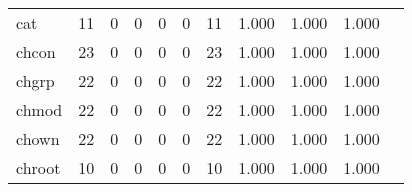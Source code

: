 \begin{longtable}{lp{1.20cm}p{1.20cm}p{1.20cm}p{1.20cm}p{1.20cm}p{1.20cm}p{1.20cm}p{1.20cm}p{1.20cm}p{1.20cm}}
cat       &                                    11 &                                                  0 &                                                  0 &                                                  0 &                                                  0 &                                                 11 &                                         1.000 &                                              1.000 &                                              1.000 \\
chcon     &                                    23 &                                                  0 &                                                  0 &                                                  0 &                                                  0 &                                                 23 &                                         1.000 &                                              1.000 &                                              1.000 \\
chgrp     &                                    22 &                                                  0 &                                                  0 &                                                  0 &                                                  0 &                                                 22 &                                         1.000 &                                              1.000 &                                              1.000 \\
chmod     &                                    22 &                                                  0 &                                                  0 &                                                  0 &                                                  0 &                                                 22 &                                         1.000 &                                              1.000 &                                              1.000 \\
chown     &                                    22 &                                                  0 &                                                  0 &                                                  0 &                                                  0 &                                                 22 &                                         1.000 &                                              1.000 &                                              1.000 \\
chroot    &                                    10 &                                                  0 &                                                  0 &                                                  0 &                                                  0 &                                                 10 &                                         1.000 &                                              1.000 &                                              1.000 \\

\end{longtable}
